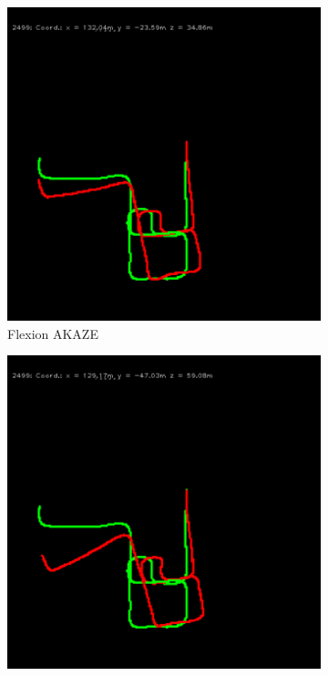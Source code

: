\begin{figure}[H]
\begin{subfigure}[c]{0.31\linewidth}
    \includegraphics[width=\linewidth]{chapter06/odo/jonas_flexion_AKAZE.png}%
    \caption{Flexion AKAZE}
\end{subfigure}%
\begin{subfigure}[c]{0.31\linewidth}
    \includegraphics[width=\linewidth]{chapter06/odo/jonas_bearing_AKAZE.png}%

\end{subfigure}
\end{figure}
